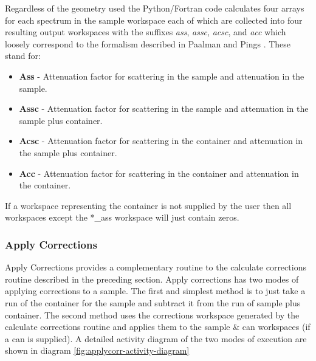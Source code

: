 \documentclass[paper=a4, fontsize=11pt]{scrartcl}	%
\numberwithin{equation}{section}															%
\numberwithin{figure}{section}																%
\numberwithin{table}{section}																%
\begin{document}
Regardless of the geometry used the Python/Fortran code calculates four arrays for each spectrum in the sample workspace each of which are collected into four resulting output workspaces with the suffixes \textit{ass}, \textit{assc}, \textit{acsc}, and \textit{acc} which loosely correspond to the formalism described in Paalman and Pings \citep{hhpaalman1962}. These stand for:

\begin{itemize}
\item \textbf{Ass} - Attenuation factor for scattering in the sample and attenuation in the sample.
\item \textbf{Assc} - Attenuation factor for scattering in the sample and attenuation in the sample plus container.
\item \textbf{Acsc} - Attenuation factor for scattering in the container and attenuation in the sample plus container.
\item \textbf{Acc} - Attenuation factor for scattering in the container and attenuation in the container.
\end{itemize}

If a workspace representing the container is not supplied by the user then all workspaces except the \**\_ass workspace will just contain zeros.

\subsubsection{Apply Corrections}
\label{subsubsec:apply-corrections}

Apply Corrections provides a complementary routine to the calculate corrections routine described in the preceding section. Apply corrections has two modes of applying corrections to a sample. The first and simplest method is to just take a run of the container for the sample and subtract it from the run of sample plus container. The second method uses the corrections workspace generated by the calculate corrections routine and applies them to the sample \& can workspaces (if a can is supplied). A detailed activity diagram of the two modes of execution are shown in diagram \ref{fig:applycorr-activity-diagram}
\end{document}
